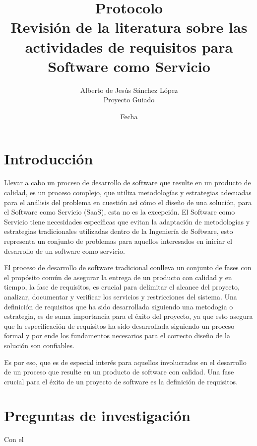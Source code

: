 \documentclass{article}
\begin{document}
  \title{%
  Protocolo \\
  \large Revisión de la literatura sobre las actividades de requisitos para Software como Servicio\\}
  \author{Alberto de Jesús Sánchez López \\ 
  \small Proyecto Guiado}
  \date{Fecha}
  \maketitle
  \thispagestyle{empty}
  \newpage

  \tableofcontents
  \thispagestyle{empty}
  \newpage

\setcounter{page}{1}
\section{Introducción}
Llevar a cabo un proceso de desarrollo de software que resulte en un producto de calidad, es 
un proceso complejo, que utiliza metodologías y estrategias adecuadas para el análisis del problema 
en cuestión asì cómo el diseño de una solución, para el Software como Servicio (SaaS), esta no es la excepción. 
El Software como Servicio tiene necesidades específicas que evitan la adaptación de metodologías y estrategias 
tradicionales utilizadas dentro de la Ingeniería de Software, esto representa un conjunto de problemas para aquellos 
interesados en iniciar el desarrollo de un software como servicio.

El proceso de desarrollo de software tradicional conlleva un conjunto de fases con el propósito común de asegurar la entrega 
de un producto con calidad y en tiempo, la fase de requisitos, es crucial para delimitar el alcance del proyecto, analizar, 
documentar y verificar los servicios y restricciones del sistema. Una definición de requisitos que ha sido desarrollada siguiendo una 
metodogìa o estrategia, es de suma importancia para el éxito del proyecto, ya que esto asegura que la especificación de requisitos ha sido 
desarrollada siguiendo un proceso formal y por ende los fundamentos necesarios para el correcto diseño de la solución son confiables.

Es por eso, que es de especial interés para aquellos involucrados en el desarrollo de un proceso que resulte en un producto de software 
con calidad. Una fase crucial para el éxito de un proyecto de software es la definición de requisitos. 
\newpage

\section{Preguntas de investigación}
Con el 
\end{document}

